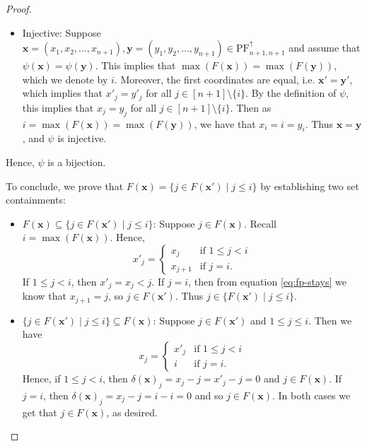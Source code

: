 \documentclass[11pt,reqno]{BICA}
\theoremstyle{definition}
\newcommand{\NDPF}{\mathrm{PF}^{\uparrow}}
\newcommand{\x}{\mathbf{x}}
\newcommand{\y}{\mathbf{y}}
\begin{document}
\begin{proof}
\begin{itemize}[leftmargin=.2in]
        \item Injective: 
         Suppose $\x=(x_1,x_2,\ldots,x_{n+1}), \y=(y_1,y_2,\ldots,y_{n+1}) \in \NDPF_{n+1,n+1}$ and assume that $\psi(\x)=\psi(\y)$. 
         This implies that  $\max(F(\x))=\max(F(\y))$, which we denote by $i$. 
         Moreover, the first coordinates are equal, i.e. $\x'=\y'$, which implies that $x'_j = y'_j$ for all $j\in[n+1]\setminus\{i\}$. By the definition of $\psi$, this implies that $x_j = y_j$ for all $j\in[n+1]\setminus\{i\}$. Then as $i=\max(F(\x))=\max(F(\y))$, we have that $x_i=i=y_i$. Thus $\x=\y$, and $\psi$ is injective.
    \end{itemize}
    Hence, $\psi$ is a bijection. 
    
    To conclude, we prove that $F(\x) = \{j \in F(\x') \mid j \leq i\}$ by establishing two set containments:
    \begin{itemize}[leftmargin=.2in]
        \item $F(\x) \subseteq \{j \in F(\x') \mid j \leq i\}$: Suppose $j \in F(\x)$. Recall $i=\max(F(\x))$. Hence,
        \[x'_j = \begin{cases}
            x_j & \mbox{if }1\leq j < i\\
            x_{j+1} & \mbox{if }j=i.
        \end{cases}\]
        If $1\leq j < i$, then  $x'_j =x_j < j$. 
        If $j = i$, then from equation \eqref{eq:fp-stays} we know that $x_{j+1} = j$, so $j \in F(\x')$. Thus $j\in\{F(\x')\mid j\leq i\}$.
        \item $ \{j \in F(\x') \mid j \leq i\}\subseteq F(\x)$: Suppose $j \in F(\x')$ and $1\leq j \leq i$. Then we have
        \[x_j = \begin{cases}
            x'_j &\mbox{if } 1\leq j < i\\
            i & \mbox{if }j=i.
        \end{cases}\]
        Hence, if $1\leq j< i$, then $\delta(\x)_j=x_j-j=x'_j-j=0$ and $j\in F(\x)$. If $j=i$, then $\delta(\x)_j=x_j-j=i-i=0$ and so $j\in F(\x)$. 
        In both cases we get that         $j \in F(\x)$, as desired.\qedhere
    \end{itemize}
\end{proof}
\end{document}
